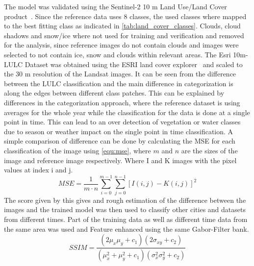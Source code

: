 \documentclass[12pt,a4paper, english,twoside]{scrartcl}
\begin{document}
      The model was validated using the Sentinel-2 10 m Land Use/Land Cover product~\autocite{Sentiel10mLULC}. 
      Since the reference data uses 8 classes, the used classes where mapped to the best fitting class as indicated in \cref{tab:land_cover_classes}. 
      Clouds, cloud shadows and snow/ice where not used for training and verification and removed for the analysis, since reference images do not contain clouds and images were selected to not contain ice, snow and clouds within relevant areas.
      The Esri 10m-\gls{LULC} Dataset was obtained using the ESRI land cover explorer~\autocite{Zhang} and scaled to the 30 m resolution of the Landsat images.
      It can be seen from the difference between the \gls{LULC} classification and the main difference in categorization is along the edges between different class patches. 
      This can be explained by differences in the categorization approach, where the reference dataset is using averages for the whole year while the classification for the data is done at a single point in time. 
      This can lead to an over detection of vegetation or water classes due to season or weather impact on the single point in time classification.
      A simple comparison of difference can be done by calculating the \gls{MSE} for each classification of the image using \cref{equ:mse}, where  $m$ and $n$ are the sizes of the image and reference image respectively. Where I and K images with the pixel values at index i and j. 
      \begin{equation}\label{equ:mse}
      MSE = \frac{1}{m\cdot n} \sum_{i=0}^{m-1} \sum_{j=0}^{n-1} {\left[I\left(i,j\right)-K\left(i,j\right)\right]}^2
      \end{equation}
      The score given by this gives and rough estimation of the difference between the images and the trained model was then used to classify other cities and datasets from different times. 
      Part of the training data as well as different time data from the same area was used and Feature enhanced using the same Gabor-Filter bank.
      \begin{equation}\label{equ:ssim}
      SSIM = \frac{(2\mu_{x}\mu_{y}+c_{1})(2\sigma_{xy}+c_{2})}{(\mu_{x}^2+\mu_{y}^2+c_{1})(\sigma_{x}^2\sigma_{y}^2+c_{2})}
      \end{equation}
\end{document}
